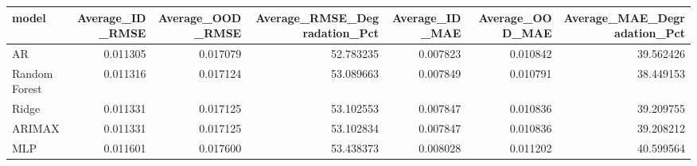 \begin{tabular}{lrrrrrr}
\toprule
model & Average_ID_RMSE & Average_OOD_RMSE & Average_RMSE_Degradation_Pct & Average_ID_MAE & Average_OOD_MAE & Average_MAE_Degradation_Pct \\
\midrule
AR & 0.011305 & 0.017079 & 52.783235 & 0.007823 & 0.010842 & 39.562426 \\
RandomForest & 0.011316 & 0.017124 & 53.089663 & 0.007849 & 0.010791 & 38.449153 \\
Ridge & 0.011331 & 0.017125 & 53.102553 & 0.007847 & 0.010836 & 39.209755 \\
ARIMAX & 0.011331 & 0.017125 & 53.102834 & 0.007847 & 0.010836 & 39.208212 \\
MLP & 0.011601 & 0.017600 & 53.438373 & 0.008028 & 0.011202 & 40.599564 \\
\bottomrule
\end{tabular}
